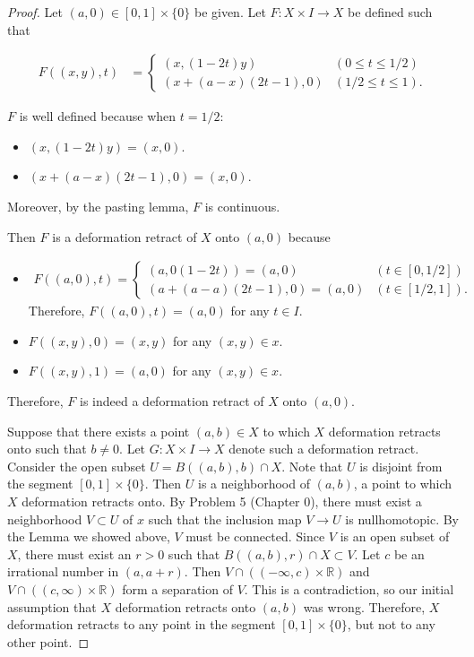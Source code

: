 \documentclass[12pt, psamsfonts]{amsart}
\theoremstyle{definition}
\theoremstyle{remark}
\numberwithin{equation}{section}
\begin{document}
\begin{proof}
  Let $(a, 0) \in [0, 1] \times \{ 0 \}$ be given.
  Let $F: X \times I \rightarrow X$ be defined such that

  \begin{align*}
    F((x, y), t) &= \begin{cases}
      (x, (1 - 2t)y) & (0 \leq t \leq 1 / 2) \\
      (x + (a - x)(2t - 1), 0) & (1 / 2 \leq t \leq 1).
    \end{cases}
  \end{align*}

  $F$ is well defined because when $t = 1 / 2$:
  \begin{itemize}
    \item
      $(x, (1 - 2t)y) = (x, 0)$.
    \item
      $(x + (a - x)(2t - 1), 0) = (x, 0)$.
  \end{itemize}
  Moreover, by the pasting lemma, $F$ is continuous.

  Then $F$ is a deformation retract of $X$ onto $(a, 0)$ because

  \begin{itemize}
    \item
      \begin{align*}
        F((a, 0), t) = \begin{cases}
          (a, 0(1 - 2t)) = (a, 0) & (t \in [0, 1 / 2]) \\
          (a + (a - a)(2t - 1), 0) = (a, 0) & (t \in [1 / 2, 1]).
        \end{cases}
      \end{align*}
      Therefore, $F((a, 0), t) = (a, 0)$ for any $t \in I$.
    \item
      $F((x, y), 0) = (x, y)$ for any $(x, y) \in x$.
    \item
      $F((x, y), 1) = (a, 0)$ for any $(x, y) \in x$.
  \end{itemize}

  Therefore, $F$ is indeed a deformation retract of $X$ onto $(a, 0)$.

  Suppose that there exists a point $(a, b) \in X$ to which $X$ deformation retracts onto such that $b \ne 0$.
  Let $G: X \times I \rightarrow X$ denote such a deformation retract.
  Consider the open subset $U = B((a, b), b) \cap X$.
  Note that $U$ is disjoint from the segment $[0, 1] \times \{ 0 \}$.
  Then $U$ is a neighborhood of $(a, b)$, a point to which $X$ deformation retracts onto.
  By Problem 5 (Chapter 0), there must exist a neighborhood $V \subset U$ of $x$ such that the inclusion map $V \rightarrow U$ is nullhomotopic.
  By the Lemma we showed above, $V$ must be connected.
  Since $V$ is an open subset of $X$, there must exist an $r > 0$ such that $B((a, b), r) \cap X \subset V$.
  Let $c$ be an irrational number in $(a, a + r)$.
  Then $V \cap ((-\infty, c) \times \mathbb{R})$ and $V \cap ((c, \infty) \times \mathbb{R})$ form a separation of $V$.
  This is a contradiction, so our initial assumption that $X$ deformation retracts onto $(a, b)$ was wrong.
  Therefore, $X$ deformation retracts to any point in the segment $[0, 1] \times \{ 0 \}$, but not to any other point.
\end{proof}
\end{document}

